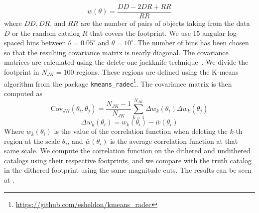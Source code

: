 \documentclass[\docopts]{\docclass}
\begin{document}
\begin{equation}
w(\theta) = \frac{DD - 2 DR + RR}{RR}
\end{equation} 
where $DD, DR$, and $RR$ are the number of pairs of objects taking from the data $D$ or the random catalog $R$ that covers the footprint. We use 15 angular log-spaced bins between $\theta=0.05^{\circ}$ and $\theta=10^{\circ}$. The number of bins has been chosen so that the resulting covariance matrix is nearly diagonal. The covariance matrices are calculated using the delete-one jackknife technique~\citep{Shao:1986:DJB,2009MNRAS.396...19N}. We divide the footprint in $N_{JK}=100$ regions. These regions are defined using the K-means algorithm from the package \texttt{kmeans\_radec}\footnote{\url{https://github.com/esheldon/kmeans\_radec}}. The covariance matrix is then computed as
\begin{equation}
\mathrm{Cov}_{JK}(\theta_{i},\theta_{j})=\frac{N_{JK}-1}{N_{JK}}\sum_{k=1}^{N_{JK}}\Delta w_{k}(\theta_{i}) \Delta w_{k}(\theta_{j})
\end{equation}
\begin{equation}
\Delta w_{k}(\theta_{i}) = w_{k}(\theta_{i})-\bar{w}(\theta_{i})
\end{equation}
Where $w_{k}(\theta_{i})$ is the value of the correlation function when deleting the $k$-th region at the scale $\theta_{i}$, and $\bar{w}(\theta_{i})$ is the average correlation function at that same scale. We compute the correlation function on the dithered and undithered catalogs using their respective footprints, and we compare with the truth catalog in the dithered footprint using the same magnitude cuts. The results can be seen at . 
\end{document}

